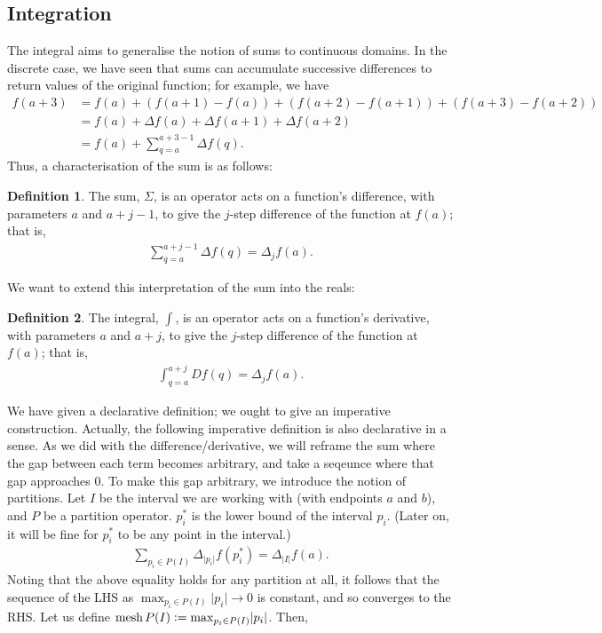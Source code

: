 \documentclass{article}
\newcommand{\vc}{\vcentcolon}
\theoremstyle{definition}
\newtheorem{defn}{Definition}[subsubsection]
\begin{document}
\newpage
\subsection{Integration}
The integral aims to generalise the notion of sums to continuous domains. In the discrete case, we have seen that sums can accumulate successive differences to return values of the original function; for example, we have
\begin{align*}
	f(a+3)&=f(a)+(f(a+1)-f(a))+(f(a+2)-f(a+1))+(f(a+3)-f(a+2))\\
	&=f(a)+\Delta f(a)+\Delta f(a+1)+\Delta f(a+2)\\
	&=f(a)+\sum_{q=a}^{a+3-1}\Delta f(q).
\end{align*}
Thus, a characterisation of the sum is as follows:
\begin{defn}
	The sum, $\Sigma$, is an operator acts on a function's difference, with parameters $a$ and $a+j-1$, to give the $j$-step difference of the function at $f(a)$; that is,
	\begin{align*}
		\sum_{q=a}^{a+j-1}\Delta f(q)=\Delta_jf(a).
	\end{align*}
\end{defn}
We want to extend this interpretation of the sum into the reals:
\begin{defn}
	The integral, $\int$, is an operator acts on a function's derivative, with parameters $a$ and $a+j$, to give the $j$-step difference of the function at $f(a)$; that is,
	\begin{align*}
		\int_{q=a}^{a+j}Df(q)=\Delta_jf(a).
	\end{align*}
\end{defn}
We have given a declarative definition; we ought to give an imperative construction. 
Actually, the following imperative definition is also declarative in a sense. As we did with the difference/derivative, we will reframe the sum where the gap between each term becomes arbitrary, and take a seqeunce where that gap approaches 0.
To make this gap arbitrary, we introduce the notion of partitions. Let $I$ be the interval we are working with (with endpoints $a$ and $b$), and $P$ be a partition operator. $p_i^*$ is the lower bound of the interval $p_i$. (Later on, it will be fine for $p_i^*$ to be any point in the interval.)
\begin{align*}
	\sum_{p_i\in P(I)}\Delta_{\lvert p_i\rvert}f(p_i^*)=\Delta_{\lvert I\rvert}f(a).
\end{align*}
Noting that the above equality holds for any partition at all, it follows that the sequence of the LHS as $\max_{p_i\in P(I)}\lvert p_i\rvert\rightarrow0$ is constant, and so converges to the RHS. Let us define $\text{mesh}\,P(I)\vc=\max_{p_i\in P(I)}\lvert p_i\rvert$. Then,
\end{document}
